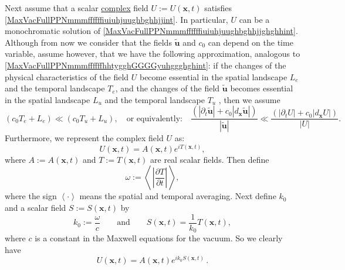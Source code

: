 \documentclass{article}
\theoremstyle{definition}
\theoremstyle{remark}
\renewcommand{\vec}[1]{\mathbf{#1}}
\newcommand{\er}{\eqref}
\newcommand{\er}{\eqref}
\begin{document}
Next assume that a scalar \underline{complex} field $U:=U(\vec x,t)$
satisfies \er{MaxVacFullPPNmmmffffffiuiuhjuughbghhjjint}. In
particular, $U$ can be a monochromatic solution of
\er{MaxVacFullPPNmmmffffffiuiuhjuughbghhjjghghhint}. Although from
now we consider that the fields $\vec {\tilde u}$ and $c_0$ can
depend on the time variable, assume however, that we have the
following approximation, analogous to
\er{MaxVacFullPPNmmmffffffhhtygghGGGGyuhggghghint}: if the changes
of the physical characteristics of the field $U$ become essential in
the spatial landscape $L_e$ and the temporal landscape $T_e$, and
the changes of the field $\vec {\tilde u}$ becomes essential in the
spatial landscape $L_{u}$ and the temporal landscape $T_{u}$ , then
we assume
\begin{equation}\label{MaxVacFullPPNmmmffffffhhtygghGGGGyuhggghghghffgint}
\left(c_0T_e+L_e\right)\ll \left(c_0T_u+L_u\right),\quad\text{or
equivalently:}\quad \frac{\left(|\partial_t\vec {\tilde u}|+c_0|
d_{\vec x}\vec {\tilde u}|\right)}{|\vec {\tilde
u}|}\ll\frac{\left(|\partial_t U|+c_0| d_{\vec x}U|\right)}{|U|}.
\end{equation}
Furthermore, we represent the complex field $U$ as:
\begin{equation}\label{MaxVacFullPPNmmmffffffiuiuhjuughbghhuiiujjjjjjjjint}
U(\vec x,t)=A(\vec x,t)e^{iT(\vec x,t)},
\end{equation}
where $A:=A(\vec x,t)$ and $T:=T(\vec x,t)$ are real scalar fields.
Then define
\begin{equation}\label{MaxVacFullPPNmmmffffffiuiuhjuughbghhuiiujjjjjjjjhhhjjjint}
\omega:=\left<\,\left|\frac{\partial T}{\partial t}\right|\,\right>,
\end{equation}
where the sign $\left<\cdot\right>$ means the spatial and temporal
averaging. Next define $k_0$ and a scalar field $S:=S(\vec x,t)$ by
\begin{equation}\label{MaxVacFullPPNmmmffffffiuiuhjuughbghhuiiujjjjjjjjhhhjjjkkint}
k_0:=\frac{\omega}{c}\quad\quad\text{and}\quad\quad S(\vec
x,t)=\frac{1}{k_0}T(\vec x,t),
\end{equation}
where $c$ is a constant in the Maxwell equations for the vacuum. So
we clearly have
\begin{equation}\label{MaxVacFullPPNmmmffffffiuiuhjuughbghhuiiujjint}
U(\vec x,t)=A(\vec x,t)e^{ik_0S(\vec x,t)}\,.
\end{equation}
\end{document}
